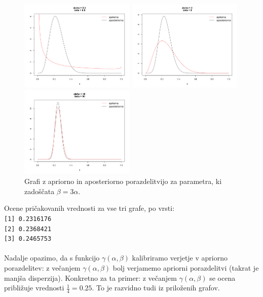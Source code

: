 \documentclass[a4paper,11pt]{article}
\begin{document}
\begin{figure}[ht!]
    \begin{minipage}{0.33\textwidth}
        \centering
        \includegraphics[width=55mm]{Slike/2_3.png}
    \end{minipage}\hfill
    \begin{minipage}{0.33\textwidth}
        \centering
        \includegraphics[width=55mm]{Slike/2_6.png}
    \end{minipage}\hfill
    \begin{minipage}{0.33\textwidth}
        \centering
        \includegraphics[width=55mm]{Slike/2_9.png}
    \end{minipage}\hfill
    \caption{Grafi z apriorno in aposteriorno porazdelitvijo za parametra, ki zadoščata  $\beta = 3 \alpha$.}
\end{figure}
Ocene pričakovanih vrednosti za vse tri grafe, po vrsti:
\\
\texttt{[1] 0.2316176}
\\
\texttt{[2] 0.2368421}
\\
\texttt{[3] 0.2465753}
\\
\\
Nadalje opazimo, da s funkcijo $\gamma(\alpha, \beta)$ kalibriramo verjetje v apriorno porazdelitev: z večanjem $\gamma(\alpha, \beta)$ bolj verjamemo apriorni porazdelitvi (takrat je manjša disperzija). 
Konkretno za ta primer: z večanjem $\gamma(\alpha, \beta)$ se ocena približuje vrednosti $\frac{1}{4} = 0.25$. To je razvidno tudi iz priloženih grafov.
\\
\end{document}
